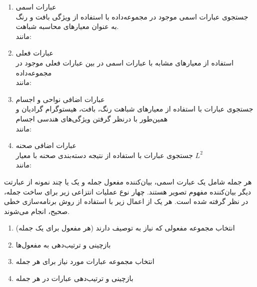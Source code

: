 \begin{enumerate}
\item عبارات اسمی
\\
جستجوی عبارات اسمی موجود در مجموعه‌داده با استفاده از ویژگی بافت و رنگ به عنوان معیارهای محاسبه شباهت.
\\
مانند:
\begin{center}
\end{center}
\item عبارات فعلی
\\
استفاده از معیارهای مشابه با عبارات اسمی در بین عبارات فعلی موجود در مجموعه‌داده
\\
مانند:
\begin{center}
\end{center}
\item {}عبارات اضافی نواحی و اجسام
\\
جستجوی عبارات با استفاده از معیارهای شباهت رنگ، بافت، هیستوگرام گرادیان و همین‌طور با درنظر گرفتن ویژگی‌های هندسی اجسام
\\
مانند:
\begin{center}
\end{center}
\item عبارات اضافی صحنه
\\
جستجوی عبارات با استفاده از نتیجه دسته‌بندی صحنه با معیار $L^2$
\\
مانند:
\begin{center}
\end{center}
\end{enumerate}

 هر جمله شامل یک عبارت اسمی، بیان‌کننده مفعول جمله و یک یا چند نمونه از عبارتت دیگر بیان‌کننده مفهوم تصویر هستند. چهار نوع عملیات انتزاعی زیر برای ساخت جمله، در نظر گرفته شده است. هر یک از اعمال زیر با استفاده از روش برنامه‌سازی خطی صحیح، انجام می‌شوند.
 
\begin{enumerate}
 \item انتخاب مجموعه مفعولی که نیاز به توصیف دارند (هر مفعول برای یک جمله)
 \item بازچینی و ترتیب‌دهی به مفعول‌ها
 \item انتخاب مجموعه‌ عبارات مورد نیاز برای هر جمله
 \item بازچینی و ترتیب‌دهی عبارات در هر جمله
\end{enumerate}

